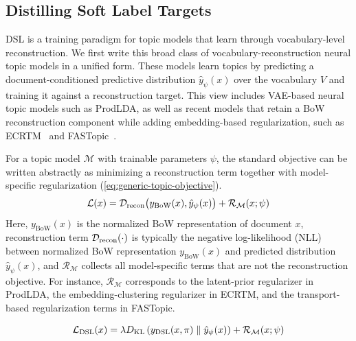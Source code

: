 \documentclass{article}
\theoremstyle{plain}
\theoremstyle{definition}
\theoremstyle{remark}
\begin{document}
\subsection{Distilling Soft Label Targets}
\label{subsec:loss}
DSL is a training paradigm for topic models that learn through vocabulary-level reconstruction.
We first write this broad class of vocabulary-reconstruction neural topic models in a unified form.
These models learn topics by predicting a document-conditioned predictive distribution $\hat{y}_{\psi}(x)$ over the vocabulary $V$ and training it against a reconstruction target. This view includes VAE-based neural topic models such as ProdLDA, as well as recent models that retain a BoW reconstruction component while adding embedding-based
regularization, such as ECRTM~\citep{wu2023effective} and
FASTopic~\citep{wu2024fastopic}.

For a topic model $\mathcal{M}$ with trainable parameters $\psi$, the standard objective can be written abstractly as minimizing a reconstruction term together with model-specific regularization (\autoref{eq:generic-topic-objective}).
\begin{equation}
\mathcal{L}(x)
=
\mathcal{D}_{\rm recon}\big(y_{\text{BoW}}(x), \hat{y}_{\psi}(x)\big)
+
\mathcal{R}_{\mathcal{M}}(x;\psi)
\label{eq:generic-topic-objective}
\end{equation}
Here, $y_{\textrm{BoW}}(x)$ is  the normalized BoW representation of document $x$, reconstruction term
$\mathcal{D}_{\rm recon}(\cdot)$ is typically the negative log-likelihood (NLL) between normalized BoW representation $y_{\textrm{BoW}}(x)$ and predicted distribution $\hat{y}_{\psi}(x)$, and $\mathcal{R}_{\mathcal{M}}$ collects all model-specific terms that are not the reconstruction objective. For instance, $\mathcal{R}_{\mathcal{M}}$ corresponds to the latent-prior regularizer in ProdLDA, the embedding-clustering regularizer in ECRTM, and the transport-based regularization terms in FASTopic.

\begin{equation}
\mathcal{L}_{\rm DSL}(x)
=
\lambda
D_{\mathrm{KL}}\left(
y_{\rm DSL}(x, \pi)
\;\middle\|\;
\hat{y}_{\psi}(x)
\right)
+
\mathcal{R}_{\mathcal{M}}(x;\psi)
\label{eq:generic-dsl-objective}
\end{equation}
\end{document}
